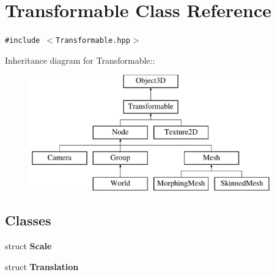 \hypertarget{classm3g_1_1Transformable}{
\section{Transformable Class Reference}
\label{classm3g_1_1Transformable}
}
{\tt \#include $<$Transformable.hpp$>$}

Inheritance diagram for Transformable::\begin{figure}[H]
\begin{center}
\leavevmode
\includegraphics[height=5cm]{classm3g_1_1Transformable}
\end{center}
\end{figure}
\subsection*{Classes}
\begin{CompactItemize}
\item 
struct \textbf{Scale}
\item 
struct \textbf{Translation}
\end{CompactItemize}
